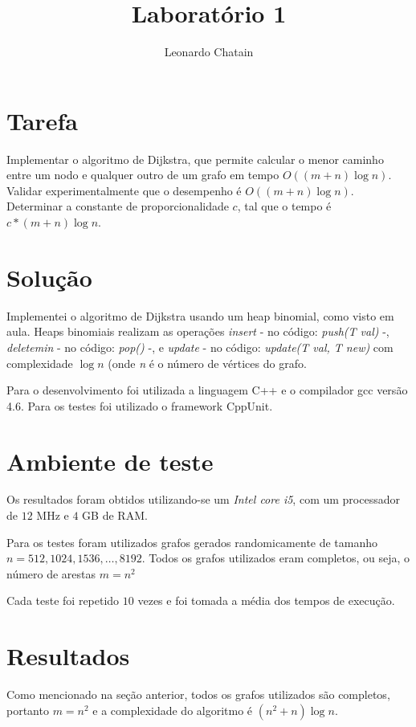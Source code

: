 \documentclass{article}
\title{Laboratório 1}
\author{Leonardo Chatain}
\begin{document}
\maketitle

\section{Tarefa}
Implementar o algoritmo de Dijkstra, que permite calcular o menor caminho entre um nodo e qualquer outro de um grafo em tempo $O((m + n) \log n)$. Validar experimentalmente que o desempenho é $O((m + n) \log n)$. Determinar a constante de proporcionalidade $c$, tal que o tempo é $c*(m + n) \log n$.

\section{Solução}
Implementei o algoritmo de Dijkstra usando um heap binomial, como visto em aula. Heaps binomiais realizam as operações \emph{insert} - no código: \emph{push(T val)} -, \emph{deletemin} - no código: \emph{pop()} -, e \emph{update} - no código: \emph{update(T val, T new)} com complexidade $ \log n $ (onde \emph{n} é o número de vértices do grafo.

Para o desenvolvimento foi utilizada a linguagem C++ e o compilador gcc versão 4.6. Para os testes foi utilizado o framework CppUnit.

\section{Ambiente de teste}

Os resultados foram obtidos utilizando-se um \emph{Intel core i5}, com um processador de $12$ MHz e $4$ GB de RAM.

Para os testes foram utilizados grafos gerados randomicamente de tamanho $n=512,1024,1536,\ldots,8192$. Todos os grafos utilizados eram completos, ou seja, o número de arestas $m=n ^ 2$

Cada teste foi repetido $10$ vezes e foi tomada a média dos tempos de execução.

\section{Resultados}

Como mencionado na seção anterior, todos os grafos utilizados são completos, portanto $m=n^2$ e a complexidade do algoritmo é $(n^2 + n) \log n$.
\end{document}
